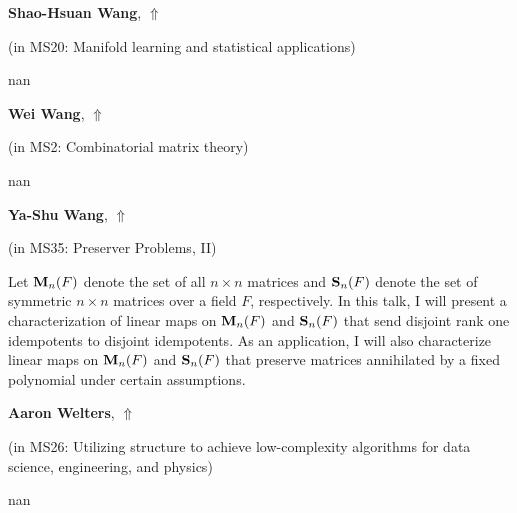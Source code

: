 \documentclass[ILAS2025-program.tex]{subfiles}
\begin{document}
     \hypertarget{down0041}{}\begin{ilasabstract}
    
    \textbf{Shao-Hsuan Wang},  \hfill \hyperlink{up0041}{$\Uparrow$}
    
    (in {\color{mstitle}MS20: Manifold learning and statistical applications})
        
        \mtskip
    nan\end{ilasabstract}
     \hypertarget{down0297}{}\begin{ilasabstract}
    
    \textbf{Wei Wang},  \hfill \hyperlink{up0297}{$\Uparrow$}
    
    (in {\color{mstitle}MS2: Combinatorial matrix theory})
        
        \mtskip
    nan\end{ilasabstract}
     \hypertarget{down0316}{}\begin{ilasabstract}
    
    \textbf{Ya-Shu Wang},  \hfill \hyperlink{up0316}{$\Uparrow$}
    
    (in {\color{mstitle}MS35: Preserver Problems, II})
        
        \mtskip
    Let ${\bf M}_n(F)$ denote the set of all $n \times n$ matrices and ${\bf S}_n(F)$ denote the set of symmetric $n \times n$ matrices over a field $F$, respectively.
In this talk, I will present a characterization of linear maps on ${\bf M}_n(F)$ and ${\bf S}_n(F)$ that send disjoint rank one idempotents to disjoint idempotents. As an application,  I will also characterize linear maps on ${\bf M}_n(F)$ and ${\bf S}_n(F)$ that preserve matrices annihilated by a fixed polynomial under certain assumptions.
\end{ilasabstract}
     \hypertarget{down0058}{}\begin{ilasabstract}
    
    \textbf{Aaron Welters},  \hfill \hyperlink{up0058}{$\Uparrow$}
    
    (in {\color{mstitle}MS26: Utilizing structure to achieve low-complexity algorithms for data science, engineering, and physics})
        
        \mtskip
    nan\end{ilasabstract}
\end{document}
